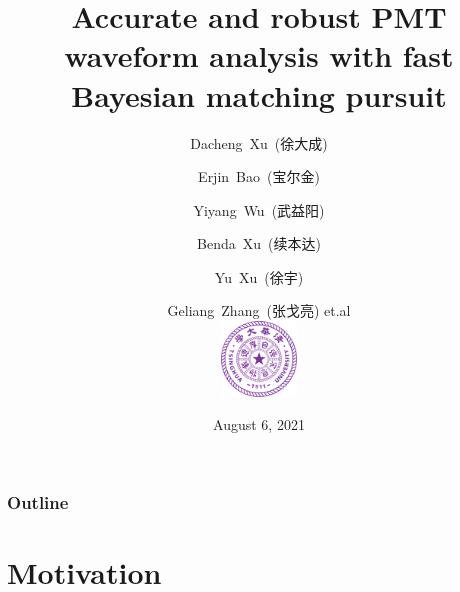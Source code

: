 \documentclass{beamer}
\title[Waveform Analysis]{Accurate and robust PMT waveform analysis with fast Bayesian matching pursuit}
\date[JUNO]{August 6, 2021}
\begin{document}
\begin{CJK*}{UTF8}{gbsn}
\author[Dacheng Xu]{Dacheng~Xu~(徐大成) \and Erjin~Bao~(宝尔金) \and Yiyang~Wu~(武益阳) \and Benda~Xu~(续本达) \and Yu~Xu~(徐宇) \and Geliang~Zhang~(张戈亮) et.al \\ [4mm] \includegraphics[height=2cm]{img/Tsinghua_University_Logo.png}}

\frame{\titlepage}

\begin{frame}[noframenumbering]
\frametitle{Outline}
\thispagestyle{empty}
\tableofcontents
\end{frame}

\section{Motivation}


\end{CJK*}
\end{document}
